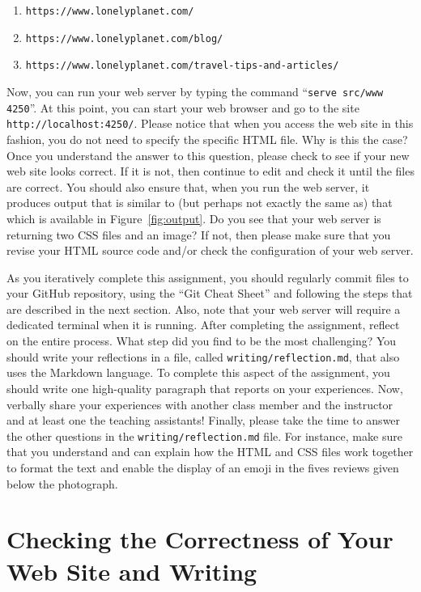 \documentclass[11pt]{article}
\newcommand{\reflection}{\lstinline{writing/reflection.md}}
\newcommand{\command}[1]{``\lstinline{#1}''}
\newcommand{\url}[1]{\lstinline{#1}}
\begin{document}
\begin{enumerate}
  \item \url{https://www.lonelyplanet.com/}
  \item \url{https://www.lonelyplanet.com/blog/}
  \item \url{https://www.lonelyplanet.com/travel-tips-and-articles/}
\end{enumerate}

Now, you can run your web server by typing the command \command{serve src/www
4250}. At this point, you can start your web browser and go to the site
\url{http://localhost:4250/}. Please notice that when you access the web site in
this fashion, you do not need to specify the specific HTML file. Why is this the
case? Once you understand the answer to this question, please check to see if
your new web site looks correct. If it is not, then continue to edit and check
it until the files are correct. You should also ensure that, when you run the
web server, it produces output that is similar to (but perhaps not exactly the
same as) that which is available in Figure~\ref{fig:output}. Do you see that
your web server is returning two CSS files and an image? If not, then please
make sure that you revise your HTML source code and/or check the configuration
of your web server.

As you iteratively complete this assignment, you should regularly commit files
to your GitHub repository, using the ``Git Cheat Sheet'' and following the steps
that are described in the next section. Also, note that your web server will
require a dedicated terminal when it is running. After completing the
assignment, reflect on the entire process. What step did you find to be the most
challenging? You should write your reflections in a file, called \reflection{},
that also uses the Markdown language. To complete this aspect of the assignment,
you should write one high-quality paragraph that reports on your experiences.
Now, verbally share your experiences with another class member and the
instructor and at least one the teaching assistants! Finally, please take the
time to answer the other questions in the \reflection{} file. For instance, make
sure that you understand and can explain how the HTML and CSS files work
together to format the text and enable the display of an emoji in the fives
reviews given below the photograph.

\section*{Checking the Correctness of Your Web Site and Writing}
\end{document}
